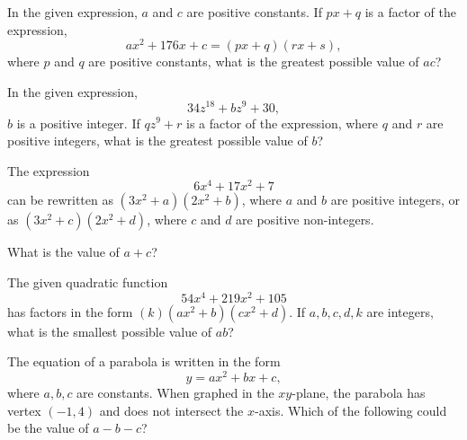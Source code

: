 \noindent\markforreview
\vspace{1em}

In the given expression, \(a\) and \(c\) are positive constants. If \(px + q\) is a factor of the expression,
\[
ax^2 + 176x + c = (px + q)(rx + s),
\]
where \(p\) and \(q\) are positive constants, what is the greatest possible value of \(ac\)?

\vspace{2em}

\noindent\markforreview
\vspace{1em}

In the given expression,
\[
34z^{18} + b z^9 + 30,
\]
\(b\) is a positive integer. If \(qz^9 + r\) is a factor of the expression, where \(q\) and \(r\) are positive integers, what is the greatest possible value of \(b\)?

\vspace{2em}

\noindent\markforreview
\vspace{1em}

The expression
\[
6x^4 + 17x^2 + 7
\]
can be rewritten as \((3x^2 + a)(2x^2 + b)\), where \(a\) and \(b\) are positive integers, or as \((3x^2 + c)(2x^2 + d)\), where \(c\) and \(d\) are positive non-integers.

What is the value of \(a + c\)?

\vspace{2em}

\noindent\markforreview
\vspace{1em}

The given quadratic function
\[
54x^4 + 219x^2 + 105
\]
has factors in the form \((k)(ax^2 + b)(cx^2 + d)\). If \(a, b, c, d, k\) are integers, what is the smallest possible value of \(ab\)?

\newpage

\noindent\markforreview
\vspace{1em}

The equation of a parabola is written in the form
\[
y = ax^2 + bx + c,
\]
where \(a, b, c\) are constants. When graphed in the \(xy\)-plane, the parabola has vertex \((-1, 4)\) and does not intersect the \(x\)-axis. Which of the following could be the value of \(a - b - c\)?


\vspace{2em}

\noindent\markforreview
\vspace{1em}

